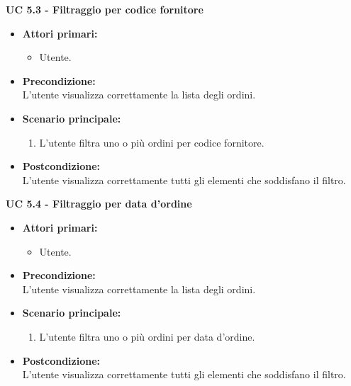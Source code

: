 \vspace{0.4cm}

\noindent \textbf{\large UC 5.3 - Filtraggio per codice fornitore}
\label{uc:filtraggio-codice-fornitore}
\begin{itemize}

	\item \textbf{Attori primari: }
		\begin{itemize}
			\item Utente.
		\end{itemize}

	\item \textbf{Precondizione: }\\[0.3cm]
		L'utente visualizza correttamente la lista degli ordini.

	\item \textbf{Scenario principale: }
		\begin{enumerate}
			\item L'utente filtra uno o più ordini per codice fornitore.
		\end{enumerate}
		

	\item \textbf{Postcondizione: }\\[0.3cm]
		L'utente visualizza correttamente tutti gli elementi che soddisfano il filtro.

\end{itemize}

\vspace{0.4cm}

\noindent \textbf{\large UC 5.4 - Filtraggio per data d'ordine}
\label{uc:filtraggio-data-ordine}
\begin{itemize}

	\item \textbf{Attori primari: }
		\begin{itemize}
			\item Utente.
		\end{itemize}

	\item \textbf{Precondizione: }\\[0.3cm]
		L'utente visualizza correttamente la lista degli ordini.

	\item \textbf{Scenario principale: }
		\begin{enumerate}
			\item L'utente filtra uno o più ordini per data d'ordine.
		\end{enumerate}
		

	\item \textbf{Postcondizione: }\\[0.3cm]
		L'utente visualizza correttamente tutti gli elementi che soddisfano il filtro.

\end{itemize}

